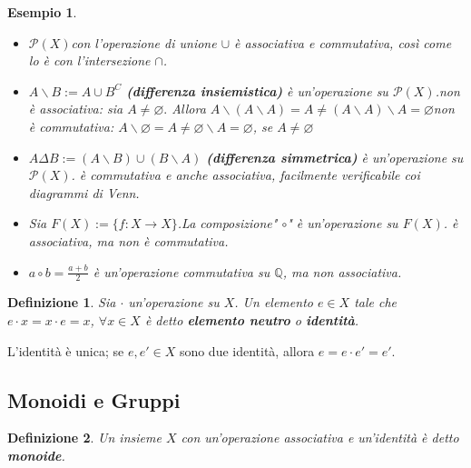 \documentclass[a4paper,12pt]{article}
\theoremstyle{def}
\newtheorem*{definition}{Definizione}
\theoremstyle{prop}
\theoremstyle{esempio}
\newtheorem*{example}{Esempio}
\theoremstyle{dimostrazione}
\theoremstyle{teo}
\theoremstyle{osservazione}
\begin{document}
\begin{example}
    \
    \begin{itemize}
        \item \(\mathcal{P}(X) \)con l'operazione di unione \(\cup\) è associativa e commutativa, così come lo è con
              l'intersezione \( \cap \).
        \item \(A \backslash B  := A \cup B^C\) \textbf{(differenza insiemistica)} è un'operazione su
              \(\mathcal{P}(X)\).\newline non è associativa: sia \(A \neq \varnothing.\) Allora \(A \backslash (A \backslash A)
              = A \neq (A\backslash A) \backslash A = \varnothing\)\newline non è commutativa: \(A \backslash \varnothing
              = A \neq \varnothing \backslash A = \varnothing\), se \(A \neq \varnothing\)
        \item \(A \Delta B := (A \backslash B) \cup (B \backslash A)\) \textbf{(differenza simmetrica)}
              è un'operazione su \(\mathcal{P}(X)\). \newline è commutativa e anche associativa, facilmente verificabile
              coi diagrammi di Venn.
        \item Sia \(F(X) := \{f : X\rightarrow X\}\).\newline La composizione" \(\circ\)" è un'operazione su \(F(X)\).
              \newline è associativa, ma non è commutativa.
        \item \(a \circ b = \frac{a + b}{2} \) è un'operazione commutativa su \(\mathbb{Q}\), ma non associativa.
    \end{itemize}
\end{example}

\begin{definition}
    Sia \(\cdot\) un'operazione su \(X\). Un elemento \(e \in X\) tale che \(e \cdot x = x \cdot e = x\), \(\forall x \in X\) è detto \textbf{elemento neutro }o \textbf{identità}.
\end{definition}

L'identità è unica; se \(e,e' \in X\) sono due identità, allora \(e = e \cdot e' = e'\).

\subsection{Monoidi e Gruppi}

\begin{definition}
    Un insieme \(X\) con un'operazione associativa e un'identità è detto \newline \textbf{monoide}.
\end{definition}
\end{document}
